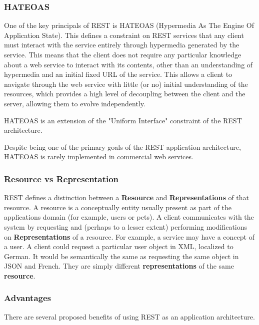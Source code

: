 \documentclass{article}
\begin{document}
\subsubsection{HATEOAS}

One of the key principals of REST is HATEOAS (Hypermedia As The Engine Of Application State). This defines a constraint on REST services that any client must interact with the service entirely through hypermedia generated by the service. This means that the client does not require any particular knowledge about a web service to interact with its contents, other than an understanding of hypermedia and an initial fixed URL of the service. This allows a client to navigate through the web service with little (or no) initial understanding of the resources, which provides a high level of decoupling between the client and the server, allowing them to evolve independently.

HATEOAS is an extension of the "Uniform Interface" constraint of the REST architecture.

Despite being one of the primary goals of the REST application architecture, HATEOAS is rarely implemented in commercial web services. 

\subsubsection{Resource vs Representation}

REST defines a distinction between a \textbf{Resource} and \textbf{Representations} of that resource. A resource is a conceptually entity usually present as part of the applications domain (for example, users or pets). A client communicates with the system by requesting and (perhaps to a lesser extent) performing modifications on \textbf{Representations} of a resource. For example, a service may have a concept of a user. A client could request a particular user object in XML, localized to German. It would be semantically the same as requesting the same object in JSON and French. They are simply different \textbf{representations} of the same \textbf{resource}.

\subsubsection{Advantages}

There are several proposed benefits of using REST as an application architecture.
\end{document}
